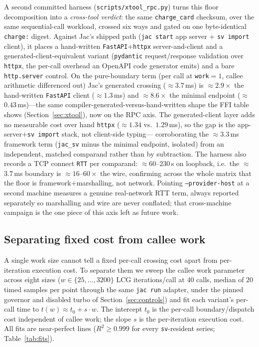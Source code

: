 \documentclass[conference]{IEEEtran}
\newcommand{\code}[1]{\texttt{#1}}
\begin{document}
A second committed harness (\code{scripts/xtool\_rpc.py}) turns this floor
decomposition into a \emph{cross-tool verdict}: the same \code{charge\_card}
checksum, over the same sequential-call workload, crossed six ways and gated on
one byte-identical \code{charge:} digest. Against Jac's shipped path
(\code{jac start} app server $+$ \code{sv~import} client), it places a
hand-written \code{FastAPI}$+$\code{httpx} server-and-client and a
generated-client-equivalent variant (\code{pydantic} request/response validation
over \code{httpx}, the per-call overhead an OpenAPI code generator emits) and a
bare \code{http.server} control. On the pure-boundary term (per call at
\code{work}${=}1$, callee arithmetic differenced out) Jac's generated crossing
($\approx$$3.7$\,ms) is $\approx$$2.9\times$ the hand-written \code{FastAPI} client
($\approx$$1.3$\,ms) and $\approx$$8.6\times$ the minimal endpoint
($\approx$$0.43$\,ms)---the same
compiler-generated-versus-hand-written shape the FFI table shows
(Section~\ref{sec:xtool}), now on the RPC axis. The generated-client layer adds
no measurable cost over hand \code{httpx} ($\approx$$1.34$ vs.\ $1.29$\,ms), so the
gap is the app-server$+$\code{sv~import} stack, not client-side typing---%
corroborating the $\approx$$3.3$\,ms framework term (\code{jac\_sv} minus the
minimal endpoint, isolated) from an independent,
matched comparand rather than by subtraction. The harness also records a TCP
connect \code{RTT} per comparand: $\approx$$60$--$230$\,\textmu s on loopback, i.e.\ the
$\approx$$3.7$\,ms boundary is $\approx$$16$--$60\times$ the wire, confirming across the whole
matrix that the floor is framework$+$marshalling, not network. Pointing
\code{--provider-host} at a second machine measures a genuine real-network RTT
term, always reported separately so marshalling and wire are never conflated;
that cross-machine campaign is the one piece of this axis left as future work.

\subsection{Separating fixed cost from callee work}
\label{sec:sweep}

A single work size cannot tell a fixed per-call crossing cost apart from
per-iteration execution cost. To separate them we sweep the callee work
parameter across eight sizes ($w\in\{25,\dots,3200\}$ LCG iterations/call at
$40$ calls, median of $20$ timed samples per point through the same \code{jac run}
adapter, under the pinned governor and disabled turbo of
Section~\ref{sec:controls}) and fit each variant's per-call time to
$t(w)\approx t_0 + s\cdot w$. The intercept $t_0$ is the per-call
boundary/dispatch cost independent of callee work; the slope $s$ is the
per-iteration execution cost. All fits are near-perfect lines
($R^2\ge0.999$ for every \code{sv}-resident series; Table~\ref{tab:fits}).
\end{document}
